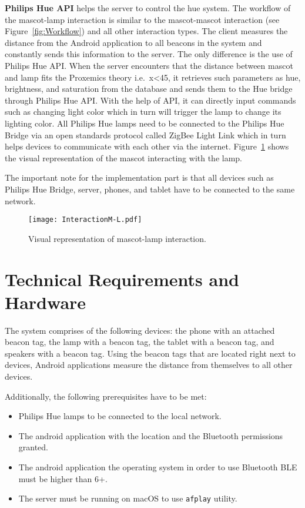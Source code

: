 \textbf{Philips Hue API} helps the server to control the hue system.
The workflow of the mascot-lamp interaction is similar to the mascot-mascot interaction (see Figure~\ref{fig:Workflow})
and all other interaction types.
The client measures the distance from the Android application to all beacons
in the system and constantly sends this information to the server.
The only difference is the use of Philips Hue API\@.
When the server encounters that the distance between mascot and lamp fits the Proxemics theory i.e.\ x<45, it
retrieves such parameters as hue, brightness, and saturation from the database and sends them
to the Hue bridge through Philips Hue API\@.
With the help of API, it can directly input commands such as changing light color which in turn will trigger the lamp to
change its lighting color.
All Philips Hue lamps need to be connected to the Philips Hue Bridge via an open
standards protocol called ZigBee Light Link which in turn helps devices to communicate with each other via the internet.
Figure~\ref{fig:InteractionMl} shows the visual representation of the mascot interacting with the lamp.

The important note for the implementation part is that all devices such as Philips Hue Bridge, server,
phones, and tablet have to be connected to the same network.
\begin{figure}[hbt!]
    \centering
    \texttt{[image: InteractionM-L.pdf]}
    \caption{Visual representation of mascot-lamp interaction.}
    \label{fig:InteractionMl}
\end{figure}

\section{Technical Requirements and Hardware}
\label{sec:technical-requirements-and-hardware}
The system comprises of the following devices: the phone with an attached beacon tag,
the lamp with a beacon tag, the tablet with a beacon tag, and speakers with a beacon tag.
Using the beacon tags that are located right next to devices, Android applications
measure the distance from themselves to all other devices.

Additionally, the following prerequisites have to be met:
\begin{itemize}
    \item Philips Hue lamps to be connected to the local network.
    \item The android application with the location and the Bluetooth permissions granted.
    \item The android application the operating system in order to use Bluetooth BLE must be higher than 6+.
    \item The server must be running on macOS to use \texttt{afplay} utility.
\end{itemize}

